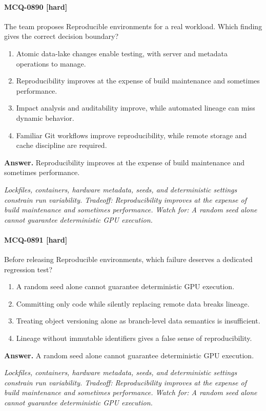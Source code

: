 \paragraph{MCQ-0890 [hard]} The team proposes Reproducible environments for a real workload. Which finding gives the correct decision boundary?
\begin{enumerate}[label=\Alph*.]
\item Atomic data-lake changes enable testing, with server and metadata operations to manage.
\item Reproducibility improves at the expense of build maintenance and sometimes performance.
\item Impact analysis and auditability improve, while automated lineage can miss dynamic behavior.
\item Familiar Git workflows improve reproducibility, while remote storage and cache discipline are required.
\end{enumerate}
\noindent\textbf{Answer.} Reproducibility improves at the expense of build maintenance and sometimes performance.
\par\textit{Lockfiles, containers, hardware metadata, seeds, and deterministic settings constrain run variability. Tradeoff: Reproducibility improves at the expense of build maintenance and sometimes performance. Watch for: A random seed alone cannot guarantee deterministic GPU execution.}
\paragraph{MCQ-0891 [hard]} Before releasing Reproducible environments, which failure deserves a dedicated regression test?
\begin{enumerate}[label=\Alph*.]
\item A random seed alone cannot guarantee deterministic GPU execution.
\item Committing only code while silently replacing remote data breaks lineage.
\item Treating object versioning alone as branch-level data semantics is insufficient.
\item Lineage without immutable identifiers gives a false sense of reproducibility.
\end{enumerate}
\noindent\textbf{Answer.} A random seed alone cannot guarantee deterministic GPU execution.
\par\textit{Lockfiles, containers, hardware metadata, seeds, and deterministic settings constrain run variability. Tradeoff: Reproducibility improves at the expense of build maintenance and sometimes performance. Watch for: A random seed alone cannot guarantee deterministic GPU execution.}
